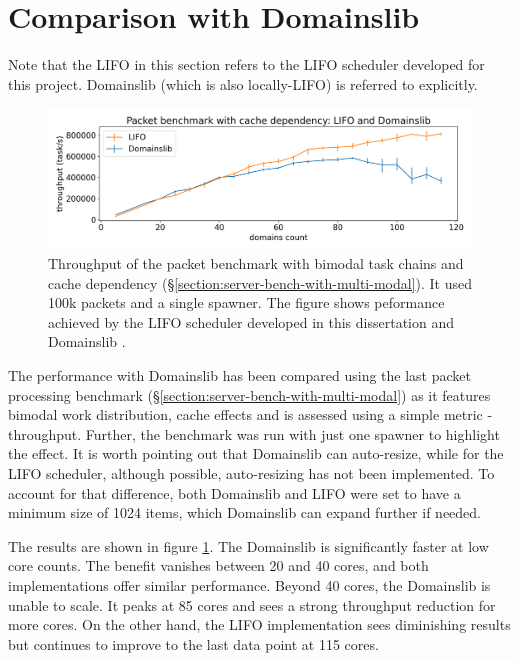 \documentclass[12pt,a4paper,twoside]{report}
\begin{document}
\section{Comparison with Domainslib}
\label{section:result_with_domainslib}

Note that the LIFO in this section refers to the LIFO scheduler developed for this project. Domainslib (which is also locally-LIFO) is referred to explicitly.

\begin{figure} 
    \centering 
    \includegraphics[width=1\textwidth]{eval/comp-base4.png}
    \caption{Throughput of the packet benchmark with bimodal task chains and cache dependency (\S\ref{section:server-bench-with-multi-modal}). It used 100k packets and a single spawner. The figure shows peformance achieved by the LIFO scheduler developed in this dissertation and Domainslib \cite{ocamlmul59:online}.}
   \label{fig:domainslib-comp}
\end{figure}

The performance with Domainslib has been compared using the last packet processing benchmark (\S\ref{section:server-bench-with-multi-modal}) as it features bimodal work distribution, cache effects and is assessed using a simple metric - throughput. Further, the benchmark was run with just one spawner to highlight the effect. It is worth pointing out that Domainslib can auto-resize, while for the LIFO scheduler, although possible, auto-resizing has not been implemented. To account for that difference, both Domainslib and LIFO were set to have a minimum size of 1024 items, which Domainslib can expand further if needed. 

The results are shown in figure \ref{fig:domainslib-comp}. The Domainslib is significantly faster at low core counts. The benefit vanishes between 20 and 40 cores, and both implementations offer similar performance. Beyond 40 cores, the Domainslib is unable to scale. It peaks at 85 cores and sees a strong throughput reduction for more cores. On the other hand, the LIFO implementation sees diminishing results but continues to improve to the last data point at 115 cores.  
\end{document}

